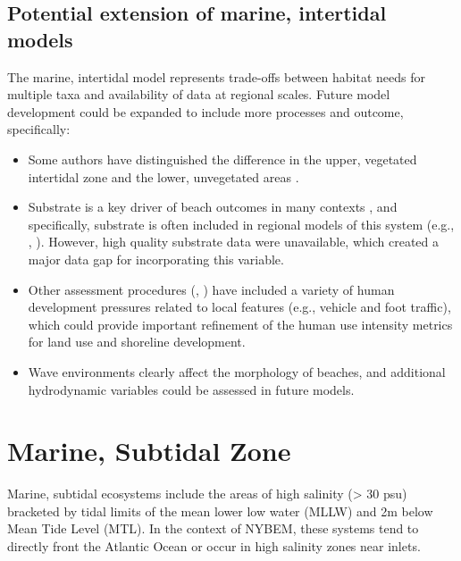 \documentclass[
]{book}
\providecommand{\tightlist}{%
  \setlength{\itemsep}{0pt}\setlength{\parskip}{0pt}}
\begin{document}
\hypertarget{potential-extension-of-marine-intertidal-models}{%
\subsection{Potential extension of marine, intertidal models}\label{potential-extension-of-marine-intertidal-models}}

The marine, intertidal model represents trade-offs between habitat needs for multiple taxa and availability of data at regional scales. Future model development could be expanded to include more processes and outcome, specifically:

\begin{itemize}
\tightlist
\item
  Some authors have distinguished the difference in the upper, vegetated intertidal zone and the lower, unvegetated areas \citep{usace_evaluation_2009}.\\
\item
  Substrate is a key driver of beach outcomes in many contexts \citep{lodder_chapter_2021}, and specifically, substrate is often included in regional models of this system (e.g., \citet{brady_habitat_1996}, \citet{avissar_modeling_2006}). However, high quality substrate data were unavailable, which created a major data gap for incorporating this variable.\\
\item
  Other assessment procedures (\citet{farmer_habitat_2000}, \citet{usace_evaluation_2009}) have included a variety of human development pressures related to local features (e.g., vehicle and foot traffic), which could provide important refinement of the human use intensity metrics for land use and shoreline development.\\
\item
  Wave environments clearly affect the morphology of beaches, and additional hydrodynamic variables could be assessed in future models.
\end{itemize}

\hypertarget{marine-subtidal-zone}{%
\section{Marine, Subtidal Zone}\label{marine-subtidal-zone}}

Marine, subtidal ecosystems include the areas of high salinity (\textgreater{} 30 psu) bracketed by tidal limits of the mean lower low water (MLLW) and 2m below Mean Tide Level (MTL). In the context of NYBEM, these systems tend to directly front the Atlantic Ocean or occur in high salinity zones near inlets.
\end{document}
